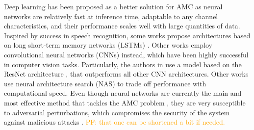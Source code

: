 \documentclass[conference]{IEEEtran}
\newcommand{\pf}[1]{{\textcolor{orange}{PF: {#1}}}}
\begin{document}
Deep learning \cite{goodfellow2016deep} has been proposed as a better solution for AMC as neural networks are relatively fast at inference time, adaptable to any channel characteristics, and their performance scales well with large quantities of data. Inspired by success in speech recognition, some works \cite{Rajendran_Meert_Giustiniano_Lenders_Pollin_2018,Guo_Jiang_Wu_Zhou_2020} propose architectures based on long short-term memory networks (LSTMs) \cite{Hochreiter_Schmidhuber_1997}. Other works \cite{OShea_Corgan_Clancy_2016,West_OShea_2017,Sadeghi_Larsson_2019} employ convolutional neural networks (CNNs) \cite{Krizhevsky_Sutskever_Hinton_2017} instead, which have been highly successful in computer vision tasks. Particularly, the authors in \cite{OShea_Roy_Clancy_2018} use a model based on the ResNet architecture \cite{Szegedy_Ioffe_Vanhoucke_Alemi_2016}, that outperforms all other CNN architectures. Other works use neural architecture search (NAS) \cite{ahmadi2008modulation,dai2019multi,perenda2021evolutionary} to trade off performance with computational speed. Even though neural networks are currently the main and most effective method that tackles the AMC problem \cite{OShea_Roy_Clancy_2018}, they are very susceptible to adversarial perturbations, which compromises the security of the system against malicious attacks  \cite{Szegedy_Zaremba_Sutskever_Bruna_Erhan_Goodfellow_Fergus_2014, moosavi2017universal,Sadeghi_Larsson_2019,Lin_Zhao_2020,Flowers_Buehrer_Headley_2019, maroto2021benefits}. \pf{that one can be shortened a bit if needed.}

\end{document}
